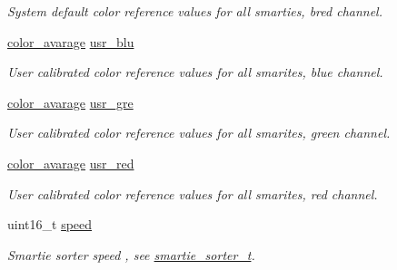 \begin{CompactItemize}
\begin{CompactList}\small\item\em System default color reference values for all smarties, bred channel. \item\end{CompactList}\item 
\hypertarget{structee__memory__t_13bee4728a634caf8d0ec18f18972b32}{
\hyperlink{system_8h_b51ee7141ec54f3e8185d9487af887d5}{color\_\-avarage} \hyperlink{structee__memory__t_13bee4728a634caf8d0ec18f18972b32}{usr\_\-blu}}
\label{structee__memory__t_13bee4728a634caf8d0ec18f18972b32}

\begin{CompactList}\small\item\em User calibrated color reference values for all smarites, blue channel. \item\end{CompactList}\item 
\hypertarget{structee__memory__t_d2b73f4590d08a5e556829996a2d4225}{
\hyperlink{system_8h_b51ee7141ec54f3e8185d9487af887d5}{color\_\-avarage} \hyperlink{structee__memory__t_d2b73f4590d08a5e556829996a2d4225}{usr\_\-gre}}
\label{structee__memory__t_d2b73f4590d08a5e556829996a2d4225}

\begin{CompactList}\small\item\em User calibrated color reference values for all smarites, green channel. \item\end{CompactList}\item 
\hypertarget{structee__memory__t_f9514a77d59e960a549843c5c90d60b7}{
\hyperlink{system_8h_b51ee7141ec54f3e8185d9487af887d5}{color\_\-avarage} \hyperlink{structee__memory__t_f9514a77d59e960a549843c5c90d60b7}{usr\_\-red}}
\label{structee__memory__t_f9514a77d59e960a549843c5c90d60b7}

\begin{CompactList}\small\item\em User calibrated color reference values for all smarites, red channel. \item\end{CompactList}\item 
\hypertarget{structee__memory__t_a09054042aa192f5228a35669e5f71ca}{
uint16\_\-t \hyperlink{structee__memory__t_a09054042aa192f5228a35669e5f71ca}{speed}}
\label{structee__memory__t_a09054042aa192f5228a35669e5f71ca}

\begin{CompactList}\small\item\em Smartie sorter speed , see \hyperlink{structsmartie__sorter__t}{smartie\_\-sorter\_\-t}. \item\end{CompactList}\end{CompactItemize}


